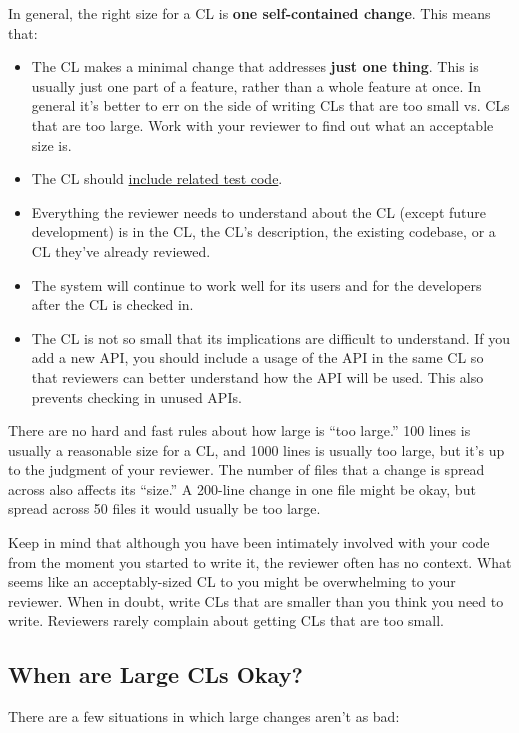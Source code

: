 \documentclass[
]{article}
\providecommand{\tightlist}{%
  \setlength{\itemsep}{0pt}\setlength{\parskip}{0pt}}
\begin{document}
In general, the right size for a CL is \textbf{one self-contained
change}. This means that:

\begin{itemize}
\tightlist
\item
  The CL makes a minimal change that addresses \textbf{just one thing}.
  This is usually just one part of a feature, rather than a whole
  feature at once. In general it's better to err on the side of writing
  CLs that are too small vs. CLs that are too large. Work with your
  reviewer to find out what an acceptable size is.
\item
  The CL should \hyperref[test_code]{include related test code}.
\item
  Everything the reviewer needs to understand about the CL (except
  future development) is in the CL, the CL's description, the existing
  codebase, or a CL they've already reviewed.
\item
  The system will continue to work well for its users and for the
  developers after the CL is checked in.
\item
  The CL is not so small that its implications are difficult to
  understand. If you add a new API, you should include a usage of the
  API in the same CL so that reviewers can better understand how the API
  will be used. This also prevents checking in unused APIs.
\end{itemize}

There are no hard and fast rules about how large is ``too large.'' 100
lines is usually a reasonable size for a CL, and 1000 lines is usually
too large, but it's up to the judgment of your reviewer. The number of
files that a change is spread across also affects its ``size.'' A
200-line change in one file might be okay, but spread across 50 files it
would usually be too large.

Keep in mind that although you have been intimately involved with your
code from the moment you started to write it, the reviewer often has no
context. What seems like an acceptably-sized CL to you might be
overwhelming to your reviewer. When in doubt, write CLs that are smaller
than you think you need to write. Reviewers rarely complain about
getting CLs that are too small.

\subsection{When are Large CLs Okay?}\label{large-okay}

There are a few situations in which large changes aren't as bad:
\end{document}
